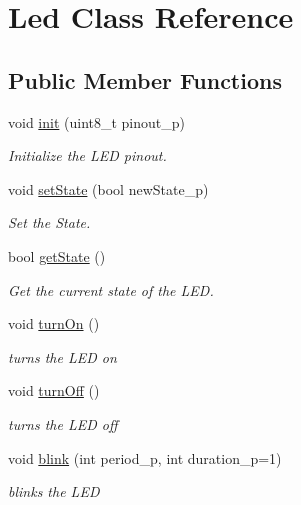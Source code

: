 \hypertarget{class_led}{}\section{Led Class Reference}
\label{class_led}
\subsection*{Public Member Functions}
\begin{DoxyCompactItemize}
\item 
void \hyperlink{class_led_a4bce8445a80436df1126471f83b0fb17}{init} (uint8\+\_\+t pinout\+\_\+p)
\begin{DoxyCompactList}\small\item\em Initialize the L\+ED pinout. \end{DoxyCompactList}\item 
void \hyperlink{class_led_a9136de456f7df8e202e880312767a566}{set\+State} (bool new\+State\+\_\+p)
\begin{DoxyCompactList}\small\item\em Set the State. \end{DoxyCompactList}\item 
bool \hyperlink{class_led_a3c98242eb57df713fcb8d441d43ccd02}{get\+State} ()
\begin{DoxyCompactList}\small\item\em Get the current state of the L\+ED. \end{DoxyCompactList}\item 
\mbox{\label{class_led_a02561ef42927779f247c0ae714a89e9a}} 
void \hyperlink{class_led_a02561ef42927779f247c0ae714a89e9a}{turn\+On} ()
\begin{DoxyCompactList}\small\item\em turns the L\+ED on \end{DoxyCompactList}\item 
\mbox{\label{class_led_a3c581311221a0fedafdfb250a1f318ab}} 
void \hyperlink{class_led_a3c581311221a0fedafdfb250a1f318ab}{turn\+Off} ()
\begin{DoxyCompactList}\small\item\em turns the L\+ED off \end{DoxyCompactList}\item 
void \hyperlink{class_led_a5ffc6040a68800545f1d063641cad66d}{blink} (int period\+\_\+p, int duration\+\_\+p=1)
\begin{DoxyCompactList}\small\item\em blinks the L\+ED \end{DoxyCompactList}\end{DoxyCompactItemize}


